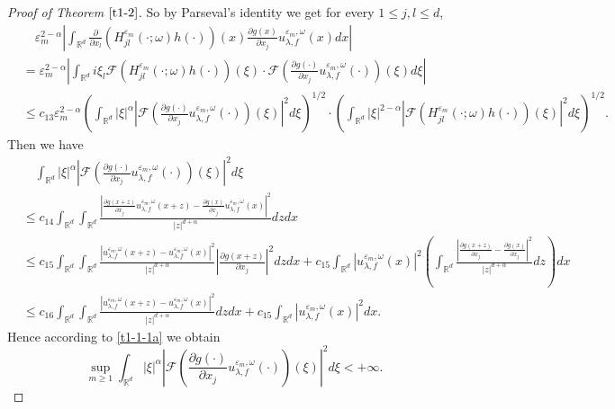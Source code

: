 \documentclass[11pt,draft, reqno]{amsart}
\renewcommand{\le}{\leqslant}
\renewcommand{\ge}{\geqslant}
\newcommand{\F}{\mathscr{F}}
\newcommand{\R}{\mathds R}
\newcommand{\e}{\varepsilon}
\newcommand{\w}{\omega}
\theoremstyle{definition}
\numberwithin{equation}{section}
\begin{document}
\begin{proof} [Proof of Theorem $\ref{t1-2}$]
So by Parseval's identity we get for every $1\le j,l\le d$,
\begin{align*}
&\quad \e_m^{2-\alpha}\left|\int_{\R^d}\frac{\partial}{\partial x_l}\left( H_{jl}^{\e_m}\left(\cdot;\w\right)h(\cdot)\right)(x)
\frac{\partial g(x)}{\partial x_j}u_{\lambda,f}^{\e_m,\w}(x)dx\right|\\
&=\e_m^{2-\alpha}\left|\int_{\R^d}i \xi_l \F\left(H_{jl}^{\e_m}\left(\cdot;\w\right)h(\cdot)\right)(\xi)
\cdot\F\left(\frac{\partial g(\cdot)}{\partial x_j}u_{\lambda,f}^{\e_m,\w}(\cdot)\right)(\xi)d\xi\right|\\
&\le c_{13}\e_m^{2-\alpha}\left(\int_{\R^d}|\xi|^\alpha\left|\F\left(\frac{\partial g(\cdot)}{\partial x_j}
u_{\lambda,f}^{\e_m,\w}(\cdot)\right)(\xi)\right|^2d\xi\right)^{1/2}\cdot
\left(\int_{\R^d}|\xi|^{2-\alpha}\left|\F\left(H_{jl}^{\e_m}\left(\cdot;\w\right)h(\cdot)\right)(\xi)\right|^2d\xi\right)^{1/2}.
\end{align*}
Then we have
\begin{align*}
&\quad\int_{\R^d}|\xi|^\alpha \left|\F\left(\frac{\partial g(\cdot)}{\partial x_j}
u_{\lambda,f}^{\e_m,\w}(\cdot)\right)(\xi)\right|^2d\xi\\
&\le c_{14}\int_{\R^d}\int_{\R^d}\frac{\left|\frac{\partial g(x+z)}{\partial x_j}
u_{\lambda,f}^{\e_m,\w}(x+z)-\frac{\partial g(x)}{\partial x_j}
u_{\lambda,f}^{\e_m,\w}(x)\right|^2}{|z|^{d+\alpha}}dzdx\\
&\le c_{15}\int_{\R^d}\int_{\R^d}\frac{|u_{\lambda,f}^{\e_m,\w}(x+z)-u_{\lambda,f}^{\e_m,\w}(x)|^2}{|z|^{d+\alpha}}
\left|\frac{\partial g(x+z)}{\partial x_j}\right|^2dzdx
+c_{15}\int_{\R^d}|u_{\lambda,f}^{\e_m,\w}(x)|^2\left(\int_{\R^d}\frac{\left|\frac{\partial g(x+z)}{\partial x_j}-\frac{\partial g(x)}{\partial x_j}\right|^2}{|z|^{d+\alpha}}dz\right)dx\\
&\le c_{16}\int_{\R^d}\int_{\R^d}\frac{|u_{\lambda,f}^{\e_m,\w}(x+z)-u_{\lambda,f}^{\e_m,\w}(x)|^2}{|z|^{d+\alpha}}
dzdx+
c_{15}\int_{\R^d}|u_{\lambda,f}^{\e_m,\w}(x)|^2dx.
\end{align*}
Hence according to \eqref{t1-1-1a} we obtain
\begin{equation}\label{t1-2-9}
\sup_{m\ge 1}\int_{\R^d}|\xi|^\alpha \left|\F\left(\frac{\partial g(\cdot)}{\partial x_j}
u_{\lambda,f}^{\e_m,\w}(\cdot)\right)(\xi)\right|^2d\xi<+\infty.
\end{equation}


\end{proof}
\end{document}
